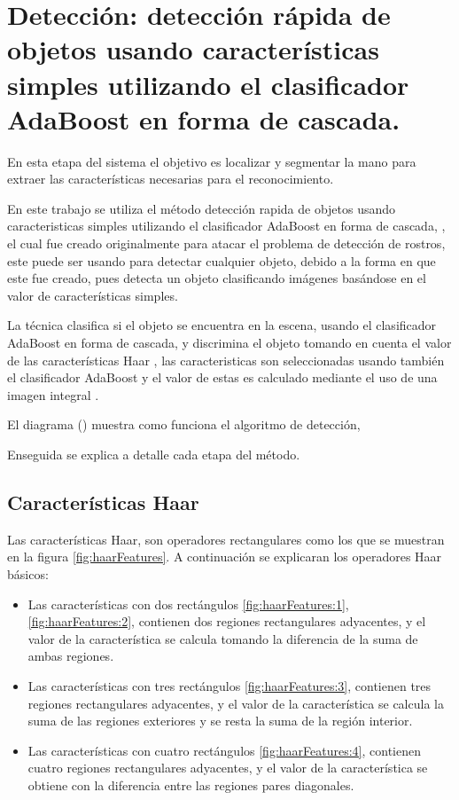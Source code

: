  
\section{Detección: detección rápida de objetos usando características simples utilizando el clasificador AdaBoost en forma de cascada.}\label{sec:ViolaJones}

En esta etapa del sistema el objetivo es localizar y segmentar la mano para extraer las características necesarias para el reconocimiento. 

En este trabajo se utiliza el método detección rapida de objetos usando caracteristicas simples utilizando el clasificador AdaBoost en forma de cascada, \citep{Viola2001}, el cual fue creado originalmente para atacar el problema de detección de rostros, este puede ser usando para detectar cualquier objeto, debido a la forma en que este fue creado, pues detecta un objeto clasificando imágenes basándose en el valor de características simples.

La técnica clasifica si el objeto se encuentra en la escena, usando el clasificador AdaBoost \citep{Freund1995} en forma de cascada, y discrimina el objeto tomando en cuenta el valor de las características Haar \citep{Viola2001}, las caracteristicas son seleccionadas usando también el clasificador AdaBoost y el valor de estas es calculado mediante el uso de una imagen integral \citep{Viola2001}. 

El diagrama () muestra como funciona el algoritmo de detección, 

Enseguida se explica a detalle cada etapa del método. 

\subsection{Características Haar}\label{subsec:CaracteristicasHaar}  

Las características Haar, son operadores rectangulares como los que se muestran en la figura \ref{fig:haarFeatures}. A continuación se explicaran los operadores Haar básicos:
\begin{itemize}
\item Las características con dos rectángulos \ref{fig:haarFeatures:1}, \ref{fig:haarFeatures:2}, contienen dos regiones rectangulares adyacentes, y el valor de la característica se calcula tomando la diferencia de la suma de ambas regiones. 

\item Las características con tres rectángulos \ref{fig:haarFeatures:3}, contienen tres regiones rectangulares adyacentes, y el valor de la característica se calcula la suma de las regiones exteriores y se resta la suma de la región interior.

\item Las características con cuatro rectángulos \ref{fig:haarFeatures:4}, contienen cuatro regiones rectangulares adyacentes, y el valor de la característica se obtiene con la diferencia entre las regiones pares diagonales.
\end{itemize} 

